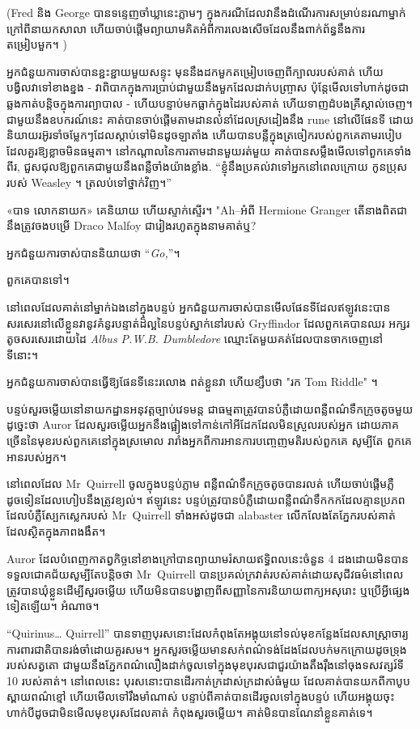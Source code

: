 {{{(Fred និង George បានទន្ទេញចាំឃ្លានេះភ្លាមៗ ក្នុងករណីដែលវានឹងដំណើរការសម្រាប់នរណាម្នាក់ក្រៅពីនាយកសាលា ហើយចាប់ផ្តើមព្យាយាមគិតអំពីការលេងសើចដែលនឹងពាក់ព័ន្ធនឹងការតម្រៀបមួក។ )

អ្នកជំនួយការចាស់បានខ្ជះខ្ជាយមួយសន្ទុះ មុននឹងដកមួកតម្រៀបចេញពីក្បាលរបស់គាត់ ហើយបង្វិលវាទៅខាងខ្នង - វាពិបាកក្នុងការប្រាប់ជាមួយនឹងមួកដែលដាក់បញ្ច្រាស ប៉ុន្តែមើលទៅហាក់ដូចជាឆ្លងកាត់បន្តិចក្នុងការព្យាបាល - ហើយបន្ទាប់មកធ្លាក់ក្នុងដៃរបស់គាត់ ហើយទាញដំបងគ្រីស្តាល់ចេញ។ ជាមួយនឹងឧបករណ៍នេះ គាត់បានចាប់ផ្តើមតាមដានលំនាំដែលស្រដៀងនឹង rune នៅលើផែនទី ដោយនិយាយរអ៊ូរទាំចម្លែកៗដែលស្តាប់ទៅមិនដូចឡាតាំង ហើយបានបន្លឺក្នុងត្រចៀករបស់ពួកគេតាមរបៀបដែលគួរឱ្យខ្លាចមិនធម្មតា។ នៅ​កណ្តាល​នៃ​ការ​តាម​ដាន​មួយ​រត់​មួយ គាត់​បាន​សម្លឹង​មើល​ទៅ​ពួក​គេ​ទាំង​ពីរ, ជួសជុល​ឱ្យ​ពួក​គេ​ជាមួយ​នឹង​ពន្លឺ​ចាំង​យ៉ាង​ខ្លាំង. “ខ្ញុំនឹងប្រគល់វាទៅអ្នកនៅពេលក្រោយ កូនប្រុសរបស់ Weasley ។ ត្រលប់ទៅថ្នាក់វិញ។”

«បាទ លោកនាយក» គេនិយាយ ហើយស្ទាក់ស្ទើរ។ "Ah--អំពី Hermione Granger តើនាងពិតជានឹងត្រូវចងបម្រើ Draco Malfoy ជារៀងរហូតក្នុងនាមគាត់ឬ?

អ្នកជំនួយការចាស់បាននិយាយថា “\emph{Go,}”។

ពួកគេបានទៅ។

នៅពេលដែលគាត់នៅម្នាក់ឯងនៅក្នុងបន្ទប់ អ្នកជំនួយការចាស់បានមើលផែនទីដែលឥឡូវនេះបានសរសេរនៅលើខ្លួនវានូវគំនូរបន្ទាត់ដ៏ល្អនៃបន្ទប់ស្នាក់នៅរបស់ Gryffindor ដែលពួកគេបានឈរ អក្សរតូចសរសេរដោយដៃ \emph{Albus P.W.B. Dumbledore} ឈ្មោះតែមួយគត់ដែលបានចាកចេញនៅទីនោះ។

អ្នកជំនួយការចាស់បានធ្វើឱ្យផែនទីនេះរលោង ពត់ខ្លួនវា ហើយខ្សឹបថា "រក Tom Riddle" ។

\later

បន្ទប់សួរចម្លើយនៅនាយកដ្ឋានអនុវត្តច្បាប់វេទមន្ត ជាធម្មតាត្រូវបានបំភ្លឺដោយពន្លឺពណ៌ទឹកក្រូចតូចមួយ ដូច្នេះថា Auror ដែលសួរចម្លើយអ្នកនឹងផ្អៀងទៅកាន់កៅអីដែកដែលមិនស្រួលរបស់អ្នក ដោយភាគច្រើននៃមុខរបស់ពួកគេនៅក្នុងស្រមោល រារាំងអ្នកពីការអានការបញ្ចេញមតិរបស់ពួកគេ សូម្បីតែ ពួកគេអានរបស់អ្នក។

នៅពេលដែល Mr~Quirrell ចូលក្នុងបន្ទប់ភ្លាម ពន្លឺពណ៌ទឹកក្រូចតូចបានរលត់ ហើយចាប់ផ្តើមភ្លឺដូចទៀនដែលហៀបនឹងត្រូវខ្យល់។ ឥឡូវនេះ បន្ទប់ត្រូវបានបំភ្លឺដោយពន្លឺពណ៌ទឹកកកដែលគ្មានប្រភព ដែលបំភ្លឺស្បែកស្លេករបស់ Mr~Quirrell ទាំងអស់ដូចជា alabaster លើកលែងតែភ្នែករបស់គាត់ដែលស្ថិតក្នុងភាពងងឹត។

Auror ដែលបំពេញកាតព្វកិច្ចនៅខាងក្រៅបានព្យាយាមរំសាយឥទ្ធិពលនេះចំនួន 4 ដងដោយមិនបានទទួលជោគជ័យសូម្បីតែបន្តិចថា Mr~Quirrell បានប្រគល់ក្រវាត់របស់គាត់ដោយសុជីវធម៌នៅពេលត្រូវបានឃុំខ្លួនដើម្បីសួរចម្លើយ ហើយមិនបានបង្ហាញពីសញ្ញានៃការនិយាយពាក្យអសុរោះ ឬប្រើអ្វីផ្សេងទៀតឡើយ។ អំណាច។

“Quirinus… Quirrell” បានទាញបុរសនោះដែលកំពុងតែអង្គុយនៅទល់មុខកន្លែងដែលសាស្ត្រាចារ្យការពារជាតិបានរង់ចាំដោយគួរសម។ អ្នកសួរចម្លើយមានសក់ពណ៌ទង់ដែងដែលបក់មកក្រោយដូចទ្រុងរបស់សត្វតោ ជាមួយនឹងភ្នែកពណ៌លឿងដាក់ចូលទៅក្នុងមុខបុរសជាជួរយ៉ាងតឹងរ៉ឹងនៅចុងទសវត្សរ៍ទី 10 របស់គាត់។ នៅពេលនេះ បុរសនោះបានដើរកាត់ក្រដាស់ក្រដាស់ធំមួយ ដែលគាត់បានយកពីកាបូបស្ពាយពណ៌ខ្មៅ ហើយមើលទៅរឹងមាំណាស់ បន្ទាប់ពីគាត់បានដើរចូលទៅក្នុងបន្ទប់ ហើយអង្គុយចុះ ហាក់បីដូចជាមិនមើលមុខបុរសដែលគាត់ កំពុងសួរចម្លើយ។ គាត់មិនបានណែនាំខ្លួនគាត់ទេ។

}}}
